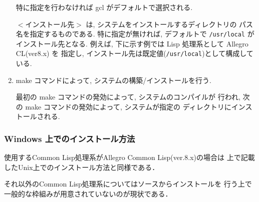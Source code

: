\begin{enumerate}
  特に指定を行わなければ gcl がデフォルトで選択される.

  $<$インストール先$>$ は, システムをインストールするディレクトリの
  パス名を指定するものである. 特に指定が無ければ,
  デフォルトで \texttt{/usr/local} がインストール先となる. 
  例えば, 下に示す例では Lisp 処理系として Allegro CL(ver8.x) を
  指定し, インストール先は既定値(\texttt{/usr/local})として構成している.
  \begin{vvtm}
    \begin{examplev}
    \end{examplev}
  \end{vvtm}  
\item make コマンドによって, システムの構築/インストールを行う.
  \begin{vvtm}
    \begin{examplev}
    \end{examplev}
  \end{vvtm}
  最初の make コマンドの発効によって, システムのコンパイルが
  行われ, 次の make コマンドの発効によって, システムが指定の
  ディレクトリにインストールされる.
\end{enumerate}

\subsubsection{Windows 上でのインストール方法}

使用するCommon Lisp処理系がAllegro Common Lisp(ver.8.x)の場合は
上で記載したUnix上でのインストール方法と同様である．

それ以外のCommon Lisp処理系についてはソースからインストールを
行う上で一般的な枠組みが用意されていないのが現状である．


